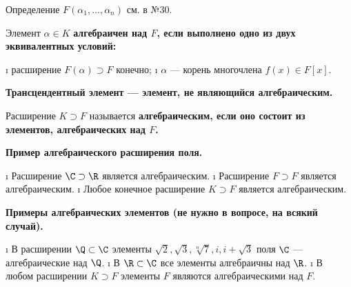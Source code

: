 \begin{defn}
Определение \(F(\alpha_1,\ldots,\alpha_n)\) см. в №30.

Элемент \(\alpha \in K\) \bf{алгебраичен} над \(F\), если выполнено одно из двух эквивалентных условий:

\begin{enumerate}
\def\labelenumi{\arabic{enumi}.}
\tightlist
\i
  расширение \(F(\alpha) \supset F\) конечно;
\i
  \(\alpha\) --- корень многочлена \(f(x) \in F[x]\).
\end{enumerate}

\end{defn}

\begin{defn}
\bf{Трансцендентный элемент} --- элемент, не являющийся алгебраическим.
\end{defn}

\begin{defn}
Расширение \(K \supset F\) называется \bf{алгебраическим}, если оно состоит из элементов, алгебраических над \(F\).
\end{defn}

\begin{defn}
\bf{Пример алгебраического расширения поля.}

\begin{itemize}
\tightlist
\i
  Расширение \(\C \supset \R\) является алгебраическим.
\i
  Расширение \(F \supset F\) является алгебраическим.
\i
  Любое конечное расширение \(K \supset F\) является алгебраическим.
\end{itemize}

\bf{Примеры алгебраических элементов (не нужно в вопросе, на всякий случай).}

\begin{itemize}
\tightlist
\i
  В расширении \(\Q \subset \C\) элементы \(\sqrt{2}, \sqrt{3}, \sqrt[n]{7}, i, i+\sqrt{3}\) поля \(\C\) --- алгебраические над \(\Q\).
\i
  В \(\R \subset \C\) все элементы алгебраичны над \(\R\).
\i
  В любом расширении \(K \supset F\) элементы \(F\) являются алгебраическими над \(F\).
\end{itemize}

\end{defn}

